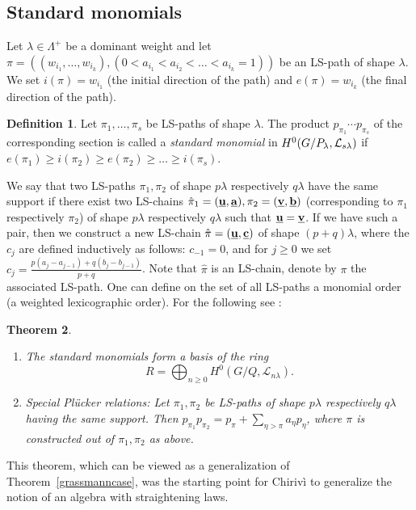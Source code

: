 \documentclass{emsprocart}
\newtheorem{theorem}{Theorem}[section]
\theoremstyle{definition}
\newtheorem{definition}[theorem]{Definition}
\begin{document}
\subsection{Standard monomials}
Let $\lambda\in \Lambda^+$ be a dominant weight and let $\pi=((w_{i_1},\ldots,w_{i_k}),(0<a_{i_1}<a_{i_2}<\ldots< a_{i_k}=1))$
be an LS-path of shape $\lambda$. We set $i(\pi)=w_{i_1}$ (the initial direction of the path) and
 $e(\pi)=w_{i_k}$ (the final direction of the path).
\begin{definition}\label{standardmonomial2}
Let $\pi_1,\ldots,\pi_s$ be LS-paths of shape $\lambda$. The product $p_{\pi_1}\cdots p_{\pi_s}$
of the corresponding section is called a {\it standard monomial} in $H^0(G/P_\lambda,{\cal L}_{s\lambda})$
if  $e(\pi_1)\ge i(\pi_2)\ge e(\pi_2)\ge\ldots\ge i(\pi_s)$.
\end{definition}
We say that two LS-paths $\pi_1,\pi_2$ of shape $p\lambda$ respectively $q\lambda$ have the same support
if there exist two LS-chains $\hat \pi_1=(\underline{\bf u},\underline{\bf a}),\pi_2=(\underline{\bf v},\underline{\bf b})$
(corresponding to $\pi_1$ respectively $\pi_2$) of shape $p\lambda$ respectively $q\lambda$ such that
$\underline{\bf u}=\underline{\bf v}$. If we have such a pair, then we construct a new LS-chain $\hat \pi =(\underline{\bf u},\underline{\bf c})$
of shape $(p+q)\lambda$, where the $c_j$ are defined inductively as follows: $c_{-1}=0$, and for $j\ge 0$ we set
$c_j=\frac{p(a_j-a_{j-1})+q(b_j-b_{j-1})}{p+q}$. Note that $\hat\pi$ is an LS-chain, denote by $\pi$ the associated LS-path.
One can define on the set of all LS-paths a monomial order (a weighted lexicographic order).
For the following see  \cite{L2}:
\begin{theorem}%
\begin{enumerate}
\item[{\it i)}] The standard monomials form a basis of  the ring
$$R=\bigoplus_{n\ge 0} H^0(G/Q,\mathcal L_{n\lambda}).$$
\item[{\it ii)}] Special Pl\"ucker relations:  Let $\pi_1,\pi_2$ be LS-paths of shape $p\lambda$ respectively $q\lambda$ having the same support.
Then $p_{\pi_1}p_{\pi_2}=p_\pi + \sum_{\eta>\pi} a_{\eta} p_\eta$, where $\pi$ is constructed out of $\pi_1,\pi_2$ as above.
\end{enumerate}
\end{theorem}
This theorem, which can be viewed as a generalization of Theorem~\ref{grassmanncase}, was the starting point
for Chiriv\`i  \cite{Ch1} to generalize the notion of an algebra with straightening laws.
\end{document}
